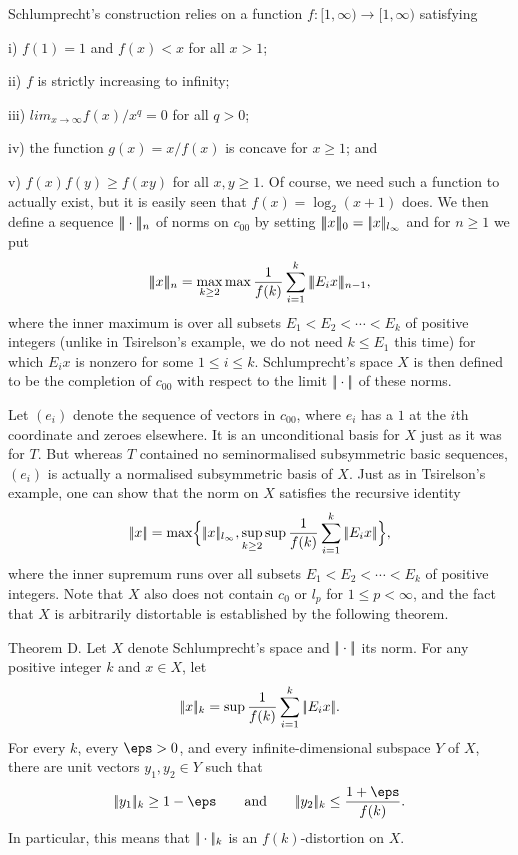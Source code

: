 Schlumprecht's construction relies on a function $f : [1,\infty)\to [1,\infty)$ satisfying
\medskip
\item{i)} $f(1) = 1$ and $f(x)<x$ for all $x>1$;
\smallskip
\item{ii)} $f$ is strictly increasing to infinity;
\smallskip
\item{iii)} $lim_{x\to\infty} f(x)/x^q = 0$ for all $q>0$;
\smallskip
\item{iv)} the function $g(x) = x/f(x)$ is concave for $x\ge 1$; and
\smallskip
\item{v)} $f(x)f(y) \ge f(xy)$ for all $x,y\ge 1$.
\medskip
Of course, we need such a function to actually exist, but it is easily seen that $f(x) = \log_2(x+1)$ does.
We then define a sequence $|\!|\!|\cdot|\!|\!|_n$ of norms on $c_{00}$ by setting
$|\!|\!|x|\!|\!|_0 = |\!|x|\!|_{l_\infty}$
and for $n\ge 1$ we put
$$\threenorm{x}_{n} = \max_{k\ge 2} \max {1\over f(k)} \sum_{i=1}^k \threenorm{E_i x}_{n-1},$$
where the inner maximum is over all subsets $E_1<E_2<\cdots <E_k$ of positive integers (unlike in
Tsirelson's example, we do not need ${k}\le E_1$ this time) for which $E_i x$ is nonzero for some $1\le i\le k$.
Schlumprecht's space $X$ is then defined to be the completion of $c_{00}$ with respect to the limit
$|\!|\cdot|\!|$ of these norms.

Let $(e_i)$ denote the sequence of vectors in $c_{00}$, where $e_i$ has a $1$ at the $i$th coordinate and
zeroes elsewhere. It is an unconditional basis for $X$ just as it was for $T$. But whereas $T$ contained no
seminormalised subsymmetric basic sequences, $(e_i)$ is actually a normalised subsymmetric basis of $X$.
Just as in Tsirelson's example, one can show that the norm on $X$ satisfies the
recursive identity
$$|\!|x|\!| = \max\Bigl\{|\!|x|\!|_{l_\infty}, \sup_{k\ge 2} \sup {1\over f(k)} \sum_{i=1}^k |\!|E_i x|\!|\Bigr\},$$
where the inner supremum runs over all subsets $E_1 < E_2<\cdots <E_k$ of positive integers.
Note that $X$ also does not contain $c_0$ or $l_p$ for $1\le p<\infty$,
and the fact that $X$ is arbitrarily
distortable is established by the following theorem.

\proclaim Theorem D. Let $X$ denote Schlumprecht's space and $|\!|\cdot|\!|$ its norm. For any positive integer
$k$ and $x\in X$, let
$$|\!|x|\!|_k = \sup {1\over f(k)} \sum_{i=1}^k |\!|E_i x|\!|.$$
For every $k$, every $\eps>0$, and every infinite-dimensional subspace $Y$ of $X$,
there are unit vectors $y_1, y_2\in Y$ such that
$$\norm{y_1}_k \ge 1-\eps\qquad\hbox{\rm and}\qquad \norm{y_2}_k \le {1+\eps\over f(k)}.$$
In particular, this means that $|\!|\cdot|\!| _k$ is an $f(k)$-distortion on $X$.\slug

